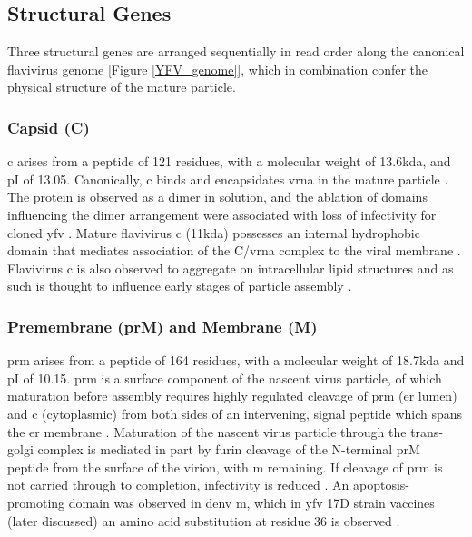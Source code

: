 \subsection{Structural Genes}
Three structural genes are arranged sequentially in read order along the canonical flavivirus genome [Figure \ref{YFV_genome}], which in combination confer the physical structure of the mature particle.

\subsubsection{Capsid (C)}
\Gls{c} arises from a peptide of 121 residues, with a molecular weight of 13.6\gls{kda}, and pI of 13.05. Canonically, \gls{c} binds and encapsidates \gls{vrna} in the mature particle \parencite{Monath:2013cu}. The protein is observed as a dimer in solution, and the ablation of domains influencing the dimer arrangement were associated with loss of infectivity for cloned \gls{yfv} \parencite{Patkar:2007ga}. Mature flavivirus \gls{c} (11\gls{kda}) possesses an internal hydrophobic domain that mediates association of the C/\gls{vrna} complex to the viral membrane \parencite{Ma:2004dh}. Flavivirus \gls{c} is also observed to aggregate on intracellular lipid structures and as such is thought to influence early stages of particle assembly \parencite{Samsa:2009bq}. 

\subsubsection{Premembrane (prM) and Membrane (M)}
\Gls{prm} arises from a peptide of 164 residues, with a molecular weight of 18.7\gls{kda} and pI of 10.15. \Gls{prm} is a surface component of the nascent virus particle, of which maturation before assembly requires highly regulated cleavage of \gls{prm} (\gls{er} lumen) and \gls{c} (cytoplasmic) from both sides of an intervening, signal peptide which spans the \gls{er} membrane \parencite{Lobigs:2010em}. Maturation of the nascent virus particle through the trans-golgi complex is mediated in part by furin cleavage of the N-terminal prM peptide from the surface of the virion, with \gls{m} remaining. If cleavage of \gls{prm} is not carried through to completion, infectivity is reduced \parencite{Wengler:1989tc}. An apoptosis-promoting domain was observed in \gls{denv} \gls{m}, which in \gls{yfv} 17D strain vaccines (later discussed) an amino acid substitution at residue 36 is observed \parencite{Catteau:2003dl}.

